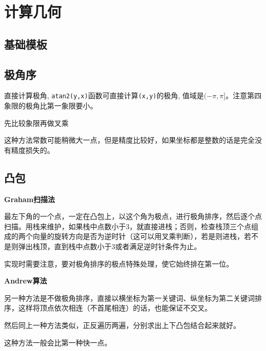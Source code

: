 \section{计算几何}

\subsection{基础模板}


\subsection{极角序}

直接计算极角, \verb|atan2(y,x)|函数可直接计算\verb|(x,y)|的极角, 值域是$(-\pi,\pi]$。注意第四象限的极角比第一象限要小。


先比较象限再做叉乘

这种方法常数可能稍微大一点，但是精度比较好，如果坐标都是整数的话是完全没有精度损失的。

\subsection{凸包}

\textbf{Graham扫描法}


最左下角的一个点，一定在凸包上，以这个角为极点，进行极角排序，然后逐个点扫描。用栈来维护，如果栈中点数小于3，就直接进栈；否则，检查栈顶三个点组成的两个向量的旋转方向是否为逆时针（这可以用叉乘判断），若是则进栈，若不是则弹出栈顶，直到栈中点数小于3或者满足逆时针条件为止。

实现时需要注意，要对极角排序的极点特殊处理，使它始终排在第一位。



\textbf{Andrew算法}

另一种方法是不做极角排序，直接以横坐标为第一关键词、纵坐标为第二关键词排序，这样将顶点依次相连（不首尾相连）的话，也能保证不交叉。

然后同上一种方法类似，正反遍历两遍，分别求出上下凸包结合起来就好。

这种方法一般会比第一种快一点。
